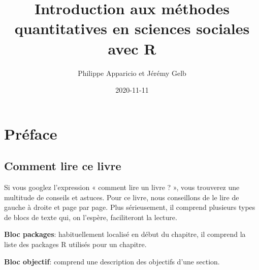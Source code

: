 \documentclass[
  11pt,
  french,
]{book}
\title{Introduction aux méthodes quantitatives en sciences sociales avec R}
\author{Philippe Apparicio et Jérémy Gelb}
\date{2020-11-11}
\makeatletter
\newenvironment{kframev}{%
\medskip{}
\setlength{\fboxsep}{.8em}
 \def\at@end@of@kframev{}%
 \ifinner\ifhmode%
  \def\at@end@of@kframev{\end{minipage}}%
  \begin{minipage}{\columnwidth}%
 \fi\fi%
 \def\FrameCommand##1{\hskip\@totalleftmargin \hskip-\fboxsep
 \colorbox{shadebluecolor}{##1}\hskip-\fboxsep
     \hskip-\linewidth \hskip-\@totalleftmargin \hskip\columnwidth}%
 \MakeFramed {\advance\hsize-\width
   \@totalleftmargin\z@ \linewidth\hsize
   \@setminipage}}%
 {\par\unskip\endMakeFramed%
 \at@end@of@kframev}
\newenvironment{rmdblock}[1]
  {
  \begin{itemize}
  \renewcommand{\labelitemi}{
    \raisebox{-.7\height}[0pt][0pt]{
      {\setkeys{Gin}{width=3em,keepaspectratio}\texttt{[image: images/\#1]}}
    }
  }
  \setlength{\fboxsep}{1em}
  \begin{kframev}
  \small
  \item
  }
  {
  \end{kframev}
  \end{itemize}
  }
\newenvironment{bloc_package}
  {\begin{rmdblock}{package}}
  {\end{rmdblock}}
\newenvironment{bloc_objectif}
  {\begin{rmdblock}{objectif}}
  {\end{rmdblock}}
\makeatother
\begin{document}
\maketitle




\renewcommand*\contentsname{Table des matières}
{
\hypersetup{linkcolor=}
\setcounter{tocdepth}{2}
\tableofcontents
}
\listoftables
\listoffigures
\hypertarget{pruxe9face}{%
\chapter*{Préface}\label{pruxe9face}}

\hypertarget{comment-lire-ce-livre}{%
\section*{Comment lire ce livre}\label{comment-lire-ce-livre}}

Si vous googlez l'expression « comment lire un livre ? », vous trouverez une multitude de conseils et astuces. Pour ce livre, nous conseillons de le lire de gauche à droite et page par page. Plus sérieusement, il comprend plusieurs types de blocs de texte qui, on l'espère, faciliteront la lecture.

\begin{bloc_package}

\textbf{Bloc packages}: habituellement localisé en début du chapitre, il comprend la liste des packages R utilisés pour un chapitre.

\end{bloc_package}

\begin{bloc_objectif}

\textbf{Bloc objectif}: comprend une description des objectifs d'une section.

\end{bloc_objectif}
\end{document}
